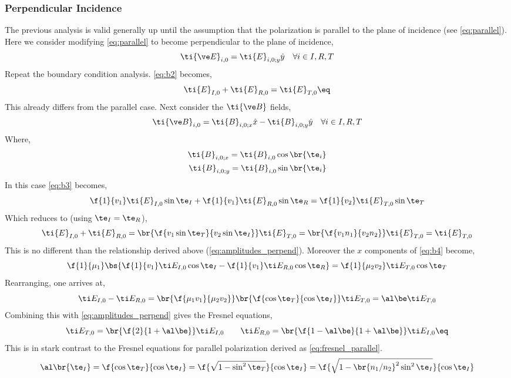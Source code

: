 \documentclass{article}
\begin{document}
\subsubsection{Perpendicular Incidence}

The previous analysis is valid generally up until the assumption that the polarization is parallel to the plane of incidence (see \cref{eq:parallel}). Here we consider modifying \cref{eq:parallel} to become perpendicular to the plane of incidence,
\[ \ti {\ve E}_{i, 0} = \ti {E}_{i, 0; y} \hat y \quad \forall i \in I, R, T\]
Repeat the boundary condition analysis. \cref{eq:b2} becomes,
\[ \ti {E}_{I, 0} + \ti {E}_{R, 0} = \ti {E}_{T, 0} \eq \label{eq:amplitudes_perpend} \]
This already differs from the parallel case. Next consider the $\ti{\ve B}$ fields,
\[ \ti {\ve B}_{i, 0} = \ti {B}_{i, 0; x} \hat x - \ti {B}_{i, 0; y} \hat y \quad \forall i \in I, R, T\]
Where,
\begin{align*}
\ti {B}_{i, 0; x} = \ti {B}_{i, 0} \cos \br{\te_i} \\
\ti {B}_{i, 0; y} = \ti {B}_{i, 0} \sin \br{\te_i}
\end{align*}
In this case \cref{eq:b3} becomes,
\[ \f{1}{v_1}\ti {E}_{I, 0} \sin \te_I + \f{1}{v_1}\ti {E}_{R, 0} \sin \te_R = \f{1}{v_2}\ti {E}_{T, 0} \sin \te_T \]
Which reduces to (using $\te_I = \te_R$),
\[ \ti {E}_{I, 0} + \ti {E}_{R, 0} = \br{\f{v_1 \sin \te_T}{v_2 \sin \te_I}}\ti {E}_{T, 0}= \br{\f{v_1 n_1}{v_2 n_2}}\ti {E}_{T, 0} = \ti {E}_{T, 0} \]
This is no different than the relationship derived above (\cref{eq:amplitudes_perpend}). Moreover the $x$ components of \cref{eq:b4} become,
\[ \f{1}{\mu_1}\bs{\f{1}{v_1} \ti E_{I, 0} \cos \te_I - \f{1}{v_1} \ti E_{R, 0} \cos \te_R} = \f{1}{\mu_2 v_2} \ti E_{T, 0} \cos \te_T \]
Rearranging, one arrives at,
\[ \ti E_{I,0} - \ti E_{R,0} = \br{\f{\mu_1 v_1}{\mu_2 v_2}}\br{\f{\cos \te_T}{\cos \te_I}}\ti E_{T,0} = \al \be\ti E_{T,0} \]
Combining this with \cref{eq:amplitudes_perpend} gives the Fresnel equations,
\[ \ti E_{T,0} = \br{\f{2}{1 + \al \be}}\ti E_{I,0} \qquad \ti E_{R,0} = \br{\f{1 - \al\be}{1 + \al \be}}\ti E_{I,0} \eq \label{eq:fresnel_perpend}\]
This is in stark contrast to the Fresnel equations for parallel polarization derived as \cref{eq:fresnel_parallel}.
\[ \al\br{\te_I} = \f{\cos \te_T}{\cos \te_I} = \f{\sqrt{1 - \sin^2 \te_T}}{\cos \te_I} = \f{\sqrt{1 - \br{n_1/n_2}^2\sin^2 \te_I}}{\cos \te_I} \]
\end{document}
